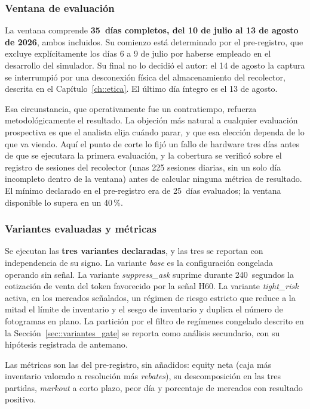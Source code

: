 \subsubsection{Ventana de evaluación}

La ventana comprende \textbf{35~días completos, del 10 de julio al 13 de agosto de 2026},
ambos incluidos. Su comienzo está determinado por el pre-registro, que excluye
explícitamente los días 6 a 9 de julio por haberse empleado en el desarrollo del
simulador. Su final no lo decidió el autor: el 14 de agosto la captura se interrumpió por
una desconexión física del almacenamiento del recolector, descrita en el
Capítulo~\ref{ch::etica}. El último día íntegro es el 13 de agosto.

Esa circunstancia, que operativamente fue un contratiempo, refuerza metodológicamente el
resultado. La objeción más natural a cualquier evaluación prospectiva es que el analista
elija cuándo parar, y que esa elección dependa de lo que va viendo. Aquí el punto de corte
lo fijó un fallo de hardware tres días antes de que se ejecutara la primera evaluación, y
la cobertura se verificó sobre el registro de sesiones del recolector (unas 225 sesiones
diarias, sin un solo día incompleto dentro de la ventana) antes de calcular ninguna
métrica de resultado. El mínimo declarado en el pre-registro era de 25~días evaluados; la
ventana disponible lo supera en un 40\,\%.

\subsubsection{Variantes evaluadas y métricas}

Se ejecutan las \textbf{tres variantes declaradas}, y las tres se reportan con independencia
de su signo. La variante \emph{base} es la configuración congelada operando sin señal. La
variante \emph{suppress\_ask} suprime durante 240~segundos la cotización de venta del token
favorecido por la señal H60. La variante \emph{tight\_risk} activa, en los mercados
señalados, un régimen de riesgo estricto que reduce a la mitad el límite de inventario y
el sesgo de inventario y duplica el número de fotogramas en plano. La partición por el
filtro de regímenes congelado descrito en la Sección~\ref{sec::variantes_gate} se reporta como
análisis secundario, con su hipótesis registrada de antemano.

Las métricas son las del pre-registro, sin añadidos: equity neta (caja más inventario
valorado a resolución más \emph{rebates}), su descomposición en las tres partidas,
\emph{markout} a corto plazo, peor día y porcentaje de mercados con resultado positivo.

